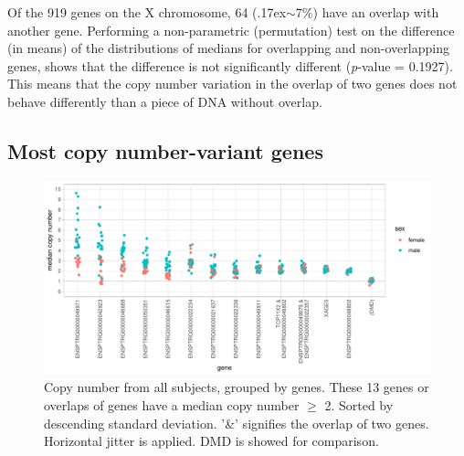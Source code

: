 \noindent Of the 919 genes on the X chromosome, 64 ({\raise.17ex\hbox{$\scriptstyle\sim$}}7\%) have an overlap with another gene. Performing a non-parametric (permutation) test on the difference (in means) of the distributions of medians for overlapping and non-overlapping genes, shows that the difference is not significantly different (\textit{p}-value = 0.1927). This means that the copy number variation in the overlap of two genes does not behave differently than a piece of DNA without overlap.






\subsection*{Most copy number-variant genes}


\begin{figure}[h] 
  \centering
  \includegraphics[scale=0.78]{figures/fig_main_3.pdf}
  \caption{Copy number from all subjects, grouped by genes. %
  These 13 genes or overlaps of genes have a median copy number $\geq$ 2. Sorted by descending standard deviation. '\&' signifies the overlap of two genes. Horizontal jitter is applied. DMD is showed for comparison. }
  \label{fig:fig_main}
\end{figure}




